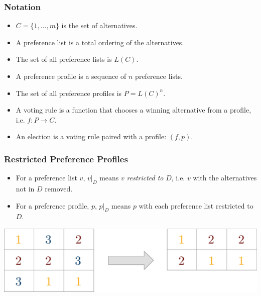 \documentclass[aspectratio=169]{beamer}
\begin{document}
		\begin{frame}
			\frametitle{Notation}
			\begin{itemize}
				\item $C = \{1, \ldots, m\}$ is the set of alternatives.
				\item A preference list is a total ordering of the alternatives.
				\item The set of all preference lists is $L(C)$.
				\item A preference profile is a sequence of $n$ preference lists.
				\item The set of all preference profiles is $P = L(C)^n$.
				\item A voting rule is a function that chooses a winning alternative from a profile, i.e. $f : P \to C$.
				\item An election is a voting rule paired with a profile: $(f, p)$.
			\end{itemize}

		\end{frame}

		\begin{frame}
			\frametitle{Restricted Preference Profiles}
			\begin{itemize}
				\item For a preference list $v$, $v|_D$ means $v$ \emph{restricted to} $D$, i.e. $v$ with the alternatives not in $D$ removed.
				\item For a preference profile, $p$, $p|_D$ means $p$ with each preference list restricted to $D$.
			\end{itemize}

			\hspace*{3.5cm}{\Large $p$}\hspace{6.2cm}{\Large $p|_{\{1, 2\}}$}

			\vspace{.5em}
			\centerline{\includegraphics[height=0.3\paperheight, keepaspectratio]{../figures/restriction_example.pdf}}
		\end{frame}
\end{document}
